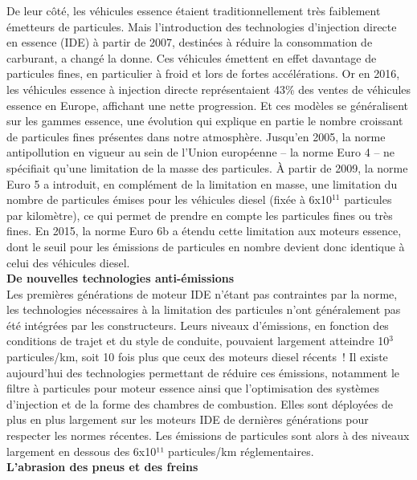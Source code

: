 \documentclass[8pt]{article}
\begin{document}
De leur côté, les véhicules essence étaient traditionnellement très faiblement émetteurs de particules. Mais l’introduction des technologies d’injection directe en essence (IDE) à partir de 2007, destinées à réduire la consommation de carburant, a changé la donne.
Ces véhicules émettent en effet davantage de particules fines, en particulier à froid et lors de fortes accélérations.
Or en 2016, les véhicules essence à injection directe représentaient 43\% des ventes de véhicules essence en Europe, affichant une nette progression. Et ces modèles se généralisent sur les gammes essence, une évolution qui explique en partie le nombre croissant de particules fines présentes dans notre atmosphère.
Jusqu’en 2005, la norme antipollution en vigueur au sein de l’Union européenne – la norme Euro 4 – ne spécifiait qu’une limitation de la masse des particules. À partir de 2009, la norme Euro 5 a introduit, en complément de la limitation en masse, une limitation du nombre de particules émises pour les véhicules diesel (fixée à 6x10$^{11}$ particules par kilomètre), ce qui permet de prendre en compte les particules fines ou très fines.
En 2015, la norme Euro 6b a étendu cette limitation aux moteurs essence, dont le seuil pour les émissions de particules en nombre devient donc identique à celui des véhicules diesel.\\

\textbf{De nouvelles technologies anti-émissions}\\

Les premières générations de moteur IDE n’étant pas contraintes par la norme, les technologies nécessaires à la limitation des particules n’ont généralement pas été intégrées par les constructeurs. Leurs niveaux d’émissions, en fonction des conditions de trajet et du style de conduite, pouvaient largement atteindre 10$^{3}$ particules/km, soit 10 fois plus que ceux des moteurs diesel récents~!
Il existe aujourd’hui des technologies permettant de réduire ces émissions, notamment le filtre à particules pour moteur essence ainsi que l’optimisation des systèmes d’injection et de la forme des chambres de combustion. Elles sont déployées de plus en plus largement sur les moteurs IDE de dernières générations pour respecter les normes récentes. Les émissions de particules sont alors à des niveaux largement en dessous des 6x10¹¹ particules/km réglementaires.\\

\textbf{L’abrasion des pneus et des freins}\\
\end{document}
